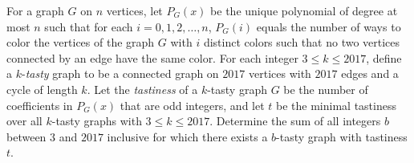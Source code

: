 For a graph $G$ on $n$ vertices, let $P_G(x)$ be the unique polynomial of degree at most $n$ such that for each $i=0,1,2,\dots,n$, $P_G (i)$ equals the number of ways to color the vertices of the graph $G$ with $i$ distinct colors such that no two vertices connected by an edge have the same color. For each integer $3\le k \le 2017$, define a $k$-\emph{tasty} graph to be a connected graph on $2017$ vertices with $2017$ edges and a cycle of length $k$. Let the \emph{tastiness} of a $k$-tasty graph $G$ be the number of coefficients in $P_G(x)$ that are odd integers, and let $t$ be the minimal tastiness over all $k$-tasty graphs with $3\le k \le 2017$. Determine the sum of all integers $b$ between $3$ and $2017$ inclusive for which there exists a $b$-tasty graph with tastiness $t$.
